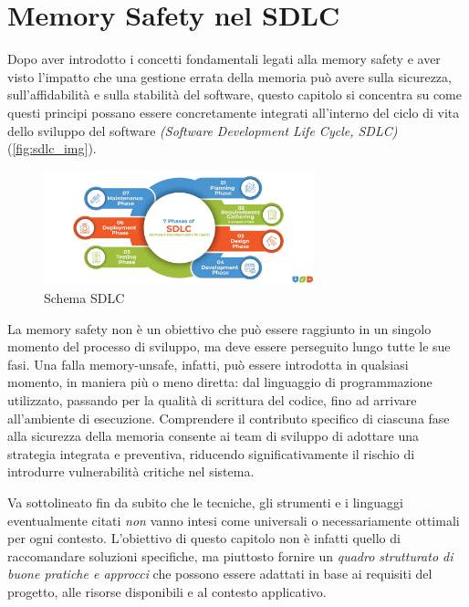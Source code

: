 \chapter{Memory Safety nel SDLC}
\label{cha:sdlc}

Dopo aver introdotto i concetti fondamentali legati alla memory safety e aver
visto l'impatto che una gestione errata della memoria può avere sulla sicurezza,
sull'affidabilità e sulla stabilità del software, questo capitolo si concentra
su come questi principi possano essere concretamente integrati all'interno del
ciclo di vita dello sviluppo del software \textit{(Software Development Life Cycle,
SDLC)}(\autoref{fig:sdlc_img}).

\begin{figure}[htbp]
  \centering
  \includegraphics[width=0.7\textwidth]{images/sdlc.png}
  \caption[Schema SDLC]{Schema SDLC\protect\footnotemark}
  \label{fig:sdlc_img}
\end{figure}

La memory safety non è un obiettivo che può essere raggiunto in un singolo momento
del processo di sviluppo, ma deve essere perseguito lungo tutte le sue fasi. Una
falla memory-unsafe, infatti, può essere introdotta in qualsiasi momento, in
maniera più o meno diretta: dal linguaggio di programmazione utilizzato,
passando per la qualità di scrittura del codice, fino ad arrivare all'ambiente di
esecuzione. Comprendere il contributo specifico di ciascuna fase alla sicurezza
della memoria consente ai team di sviluppo di adottare una strategia integrata e
preventiva, riducendo significativamente il rischio di introdurre vulnerabilità critiche
nel sistema.

Va sottolineato fin da subito che le tecniche, gli strumenti e i linguaggi
eventualmente citati \textit{non} vanno intesi come universali o necessariamente
ottimali per ogni contesto. L'obiettivo di questo capitolo non è infatti quello
di raccomandare soluzioni specifiche, ma piuttosto fornire un \textit{quadro
strutturato di buone pratiche e approcci} che possono essere adattati in base ai
requisiti del progetto, alle risorse disponibili e al contesto applicativo.





